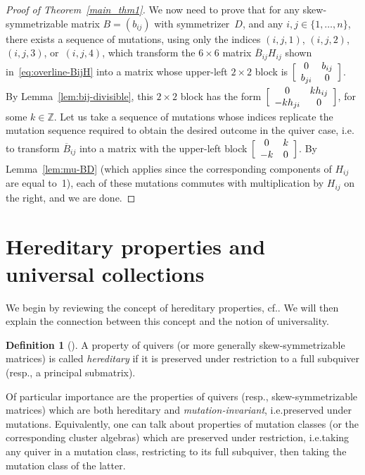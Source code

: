 \documentclass[10pt]{amsart}
\theoremstyle{definition}
\newtheorem{definition}[theorem]{Definition}
\newcommand{\cf}{cf.}
\newcommand{\ie}{i.e.}
\begin{document}
\begin{proof}[Proof of Theorem~\ref{main_thm1}]
We now need to prove that for any skew-symmetrizable matrix $B=(b_{ij})$ with symmetrizer~$D$, and any $i,j\in\{1,\dots,n\}$, there exists a sequence of mutations, using only the indices $(i,j,1)$, $(i,j,2)$, $(i,j,3)$, or~$(i,j,4)$, which transform the $6\times 6$ matrix $\overline B_{ij} H_{ij}$ shown in~\eqref{eq:overline-BijH} into a matrix whose upper-left $2\times 2$ block is $\Bigl[\begin{array}{cc} 0 & b_{ij}\\ b_{ji} & 0 \end{array}\Bigr]$. 
By Lemma~\ref{lem:bij-divisible}, this $2\times 2$ block has the form $ \Bigl[\begin{array}{cc}
0 & kh_{ij} \\
-kh_{ji} & 0
\end{array}\Bigr]$, for some $k\in\mathbb{Z}$. 
Let us take a sequence of mutations whose indices replicate the mutation sequence required to obtain the desired outcome in the quiver case, \ie 
to transform $\overline B_{ij}$ into a matrix with the upper-left block $\Bigl[\begin{array}{cc}
0 & k \\
-k & 0
\end{array}\Bigr]$. 
By Lemma~\ref{lem:mu-BD} (which applies since the corresponding components of $H_{ij}$ are equal to~1), each of these mutations commutes with multiplication by $H_{ij}$ on the right, and we are done. 
\end{proof}


\section{Hereditary properties and universal collections}
\label{sec:hereditary+universal}

We begin by reviewing the concept of hereditary properties, \cf \cite[Section~4.1]{FWZ}. We will then explain the connection between this concept and the notion of universality. 

\begin{definition}[{\cite[Definition~4.1.3]{FWZ}}]
\label{def:hereditary}
A property of quivers (or more generally skew-symmetrizable matrices) is called \emph{hereditary} if it is preserved under restriction to a full subquiver (resp., a principal submatrix). 

Of particular importance are the properties of quivers (resp., skew-symmetrizable matrices) which are both hereditary and \emph{mutation-invariant}, \ie preserved under mutations. 
Equivalently, one can talk about properties of mutation classes (or the corresponding cluster algebras) which are preserved under restriction, \ie taking any quiver in a mutation class, restricting to its full subquiver, then taking the mutation class of the latter. 
\end{definition}
\end{document}
